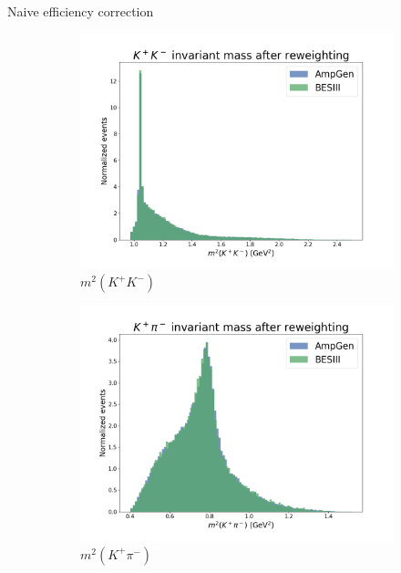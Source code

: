 \documentclass{beamer}
\begin{document}
\begin{frame}{Naive efficiency correction}
  \begin{figure}
    \begin{subfigure}{0.33\textwidth}
      \includegraphics[width = 1.0\textwidth]{Plots/s01_AfterReweighting.png}
      \caption{$m^2(K^+K^-)$}
    \end{subfigure}%
    \begin{subfigure}{0.33\textwidth}
      \includegraphics[width = 1.0\textwidth]{Plots/s03_AfterReweighting.png}
      \caption{$m^2(K^+\pi^-)$}
    \end{subfigure}%
    \begin{subfigure}{0.33\textwidth}

\end{subfigure}
\end{figure}
\end{frame}
\end{document}
